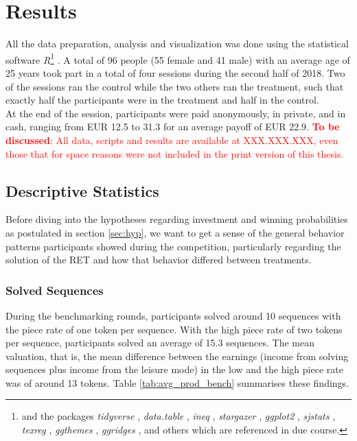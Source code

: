 \chapter{Results}
\label{ch:results}
\thispagestyle{fancy}

All the data preparation, analysis and visualization was done using the statistical software \textit{R}\footnote{and the packages \textit{tidyverse} \citep{wickham2017b}, \textit{data.table} \citep{dowle2018}, \textit{ineq} \citep{zeileis2014}, \textit{stargazer} \citep{hlavac2018}, \textit{ggplot2} \citep{wickham2016}, \textit{sjstats} \citep{ludecke2018}, \textit{texreg} \citep{leifeld2013}, \textit{ggthemes} \citep{arnold2018}, \textit{ggridges} \citep{wilke2018}, and others which are referenced in due course.} \citep{rcoreteam2014}. A total of 96 people (55 female and 41 male) with an average age of 25 years took part in a total of four sessions during the second half of 2018. Two of the sessions ran the control while the two others ran the treatment, such that exactly half the participants were in the treatment and half in the control.\\

At the end of the session, participants were paid anonymously, in private, and in cash, ranging from EUR 12.5 to 31.3 for an average payoff of EUR 22.9.  \textcolor{red}{\textbf{To be discussed}: All data, scripts and results are available at XXX.XXX.XXX, even those that for space reasons were not included in the print version of this thesis.}\\

\section{Descriptive Statistics}

Before diving into the hypotheses regarding investment and winning probabilities as postulated in section \ref{sec:hyp}, we want to get a sense of the general behavior patterns participants showed during the competition, particularly regarding the solution of the RET and how that behavior differed between treatments.

\subsection{Solved Sequences}
\label{sec:seq_prod}

During the benchmarking rounds, participants solved around 10 sequences with the piece rate of one token per sequence. With the high piece rate of two tokens per sequence, participants solved an average of 15.3 sequences. The mean valuation, that is, the mean difference between the earnings (income from solving sequences plus income from the leisure mode) in the low and the high piece rate was of around 13 tokens. Table \ref{tab:avg_prod_bench} summarises these findings.\\

